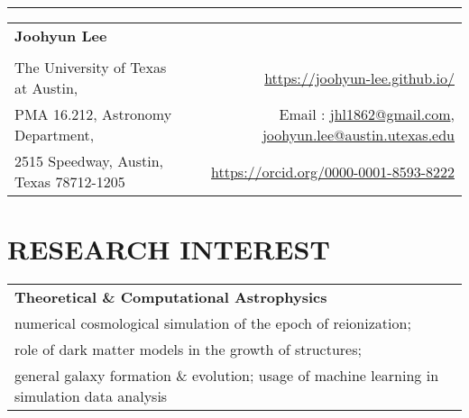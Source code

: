 \documentclass[letterpaper,10pt]{article}
\begin{document}
{}

\rule{1\textwidth}{1.5pt}
\vspace{1pt}

\begin{tabular*}{\textwidth}{l@{\extracolsep{\fill}}r}
  \textbf{\LARGE Joohyun Lee} & \\
  \\[-11pt]
  The University of Texas at Austin, &
  \href{https://joohyun-lee.github.io/}{https://joohyun-lee.github.io/}\\
  PMA 16.212, Astronomy Department, & 
  Email : \href{mailto:jhl1862@gmail.com}{jhl1862@gmail.com}, \href{mailto:jhl1862@austin.utexas.edu}{joohyun.lee@austin.utexas.edu}\\
  2515 Speedway, Austin, Texas 78712-1205 &
  \href{https://orcid.org/0000-0001-8593-8222}{https://orcid.org/0000-0001-8593-8222}
\end{tabular*}


\section{\textbf{RESEARCH INTEREST}}
\begin{center}
\begin{tabular*}{0.97\textwidth}{l}
  \textbf{Theoretical \& Computational Astrophysics}\\
  numerical cosmological simulation of the epoch of reionization;\\
  role of dark matter models in the growth of structures;\\
  general galaxy formation \& evolution; usage of machine learning in simulation data analysis\\
\end{tabular*}
\end{center}


\vspace{-15pt}
\end{document}
